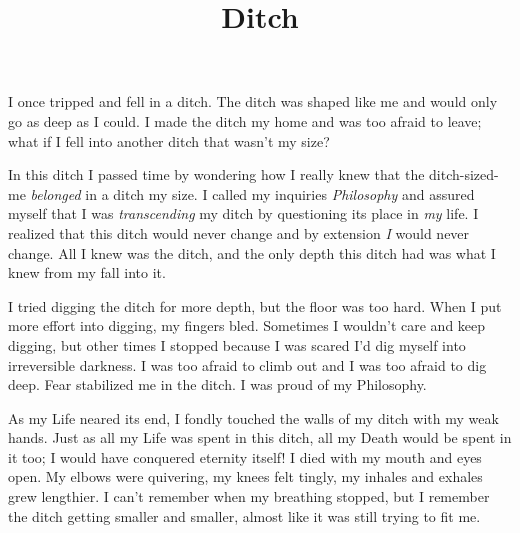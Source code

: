 \documentclass{article}
\title{Ditch}
\begin{document}
 \newline

I once tripped and fell in a ditch. The ditch was shaped like me and
would only go as deep as I could. I made the ditch my home and was too
afraid to leave; what if I fell into another ditch that wasn't my size?
\newline
\newline


In this ditch I passed time by wondering how I really knew that the
ditch-sized-me \textit{belonged} in a ditch my size. I called my
inquiries \textit{Philosophy} and assured myself that I was
\textit{transcending} my ditch by questioning its place in \textit{my}
life. I realized that this ditch would never change and by extension
\textit{I} would never change. All I knew was the ditch, and the only
depth this ditch had was what I knew from my fall into it. 
\newline
\newline


I tried digging the ditch for more depth, but the floor was too hard.
When I put more effort into digging, my fingers bled. Sometimes
I wouldn't care and keep digging, but other times I stopped because
I was scared I'd dig myself into irreversible darkness. I was too afraid
to climb out and I was too afraid to dig deep. Fear stabilized me in the
ditch. I was proud of my Philosophy. 
\newline
\newline


As my Life neared its end, I fondly touched the walls of my ditch with
my weak hands. Just as all my Life was spent in this ditch, all my Death
would be spent in it too; I would have conquered eternity itself! I died
with my mouth and eyes open. My elbows were quivering, my knees felt
tingly, my inhales and exhales grew lengthier. I can't remember when my
breathing stopped, but I remember the ditch getting smaller and smaller,
almost like it was still trying to fit me. \newline
\end{document}
